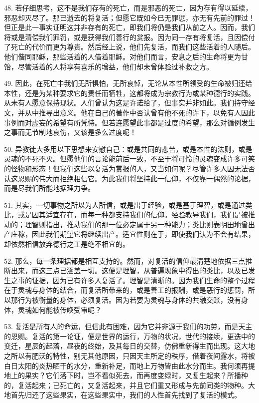 48. 若仔细思考，这不是我们存有的死亡，而是邪恶的死亡，因为存有得以延续，邪恶却灭尽了。那已逝去的将复活；但愿它既如今已无罪愆，亦无有先前的罪过！但正是此一事实证明这并非存有的死亡，即我们将仍是我们从前之人。因而，我们将或是清偿我们罪罚，或是获得我们善行的赏报。因为同一存有将复活，且因偿付了死亡的代价而更为尊贵。然后经上说，他们先复活，而我们这些活着的人随后。他们偕同耶稣，那些活着的人借着耶稣。对他们而言，安息之后的生命将更为甘饴，尽管活着的人将享有喜乐的增益，他们却未曾体验过补救之方。\par

49. 因此，在死亡中我们无所惧怕，无所哀悼，无论从本性所领受的生命被归还给本性，还是为某种要求它的责任而牺牲，这都将成为宗教行为或某种德行的实践。从未有人愿意保持现状。人们曾认为这是许诺给了，但事实并非如此。我们持守经文，并从中推导出意义。他在自己的著作中否认曾有他不死的许下，以免有人因此事例而对虚妄的希望有所凭恃。但若连愿望此事都是过度的希望，那么对循例发生之事而无节制地哀伤，又该是多么过度呢！\par

50. 异教徒大多用以下思想来安慰自己：或是共同的悲苦，或是本性的法则，或是灵魂的不死不灭。但愿他们的言论能前后一致，不至于将可怜的灵魂变成许多可笑的怪物和形态！但我们这些以复活为赏报的人，又当如何呢？尽管许多人因无法否认这恩赐的伟大而拒绝相信它。为此我们将坚持此一信仰，不仅靠一偶然的论据，而是尽我们所能地据理力争。\par

51. 其实，一切事物之所以为人所信，或是出于经验，或是基于理智，或是通过类比，或是因其适宜存在，而每一种都支持我们的信仰。经验教导我们，我们是被推动的；理智则指出，推动我们的那一位必定属于另一种能力；类比则表明田地曾出产庄稼，因此我们期望它将继续出产。适宜性则在于，即使我们认为不会有结果，却依然相信放弃德行之工是绝不相宜的。\par

52. 那么，每一条理据都是相互支持的。然而，对复活的信仰最清楚地依据三点推断出来，而这三点已涵盖一切。这便是理智，从普遍现象中得出的类比，以及已发生之事的证据，因为已有许多人复活了。理智是清晰的。因为我们生命的整个过程在于灵魂与身体的结合，而复活所带来的，或是善工的报酬，或是恶行的惩罚，所以那行为被衡量的身体，必须复活。因为若要为灵魂与身体的共融交账，没有身体，灵魂如何能被传唤受审呢？\par

53. 复活是所有人的命运，但信此有困难，因为它并非源于我们的功劳，而是天主的恩赐。复活的第一论证，便是世界的运行，万物的状况，世代的接续，更迭中的变迁，星辰的起落，昼夜的终始，及其每日的交替，仿佛重新得生而出现。这大地之所以有肥沃的特性，别无其他原因，只因天主所定的秩序，借着夜间露水，将被白日太阳的炎热晒干的水分，重新补足，而地上万物皆由此水分而生。我何须再提地上的果实？它们落下时，岂不看似死去，而再度变绿时，又复生起来？所播种的，复活起来；已死亡的，又复活起来，并且它们重又形成与先前同类的物种。大地首先归还了这些果实，在这些果实中，我们的人性首先找到了复活的模式。\par

